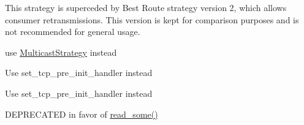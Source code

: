 \begin{DoxyRefList}
\item[\label{deprecated__deprecated000045}%
\hypertarget{deprecated__deprecated000045}{}%
Class \hyperlink{classnfd_1_1fw_1_1BestRouteStrategy}{nfd\+:\+:fw\+:\+:Best\+Route\+Strategy} ]This strategy is superceded by Best Route strategy version 2, which allows consumer retransmissions. This version is kept for comparison purposes and is not recommended for general usage.  
\item[\label{deprecated__deprecated000046}%
\hypertarget{deprecated__deprecated000046}{}%
Class \hyperlink{classnfd_1_1fw_1_1BroadcastStrategy}{nfd\+:\+:fw\+:\+:Broadcast\+Strategy} ]use \hyperlink{classnfd_1_1fw_1_1MulticastStrategy}{Multicast\+Strategy} instead  
\item[\label{deprecated__deprecated000047}%
\hypertarget{deprecated__deprecated000047}{}%
Member \hyperlink{classwebsocketpp_1_1transport_1_1asio_1_1connection_abb0254e3207691c45c9ca7061352a90a}{websocketpp\+:\+:transport\+:\+:asio\+:\+:connection$<$ config $>$\+:\+:set\+\_\+tcp\+\_\+init\+\_\+handler} (tcp\+\_\+init\+\_\+handler h)]Use set\+\_\+tcp\+\_\+pre\+\_\+init\+\_\+handler instead 
\item[\label{deprecated__deprecated000048}%
\hypertarget{deprecated__deprecated000048}{}%
Member \hyperlink{classwebsocketpp_1_1transport_1_1asio_1_1endpoint_a497f353a5ec277355cd8b0caf893d1ce}{websocketpp\+:\+:transport\+:\+:asio\+:\+:endpoint$<$ config $>$\+:\+:set\+\_\+tcp\+\_\+init\+\_\+handler} (tcp\+\_\+init\+\_\+handler h)]Use set\+\_\+tcp\+\_\+pre\+\_\+init\+\_\+handler instead 
\item[\label{deprecated__deprecated000049}%
\hypertarget{deprecated__deprecated000049}{}%
Member \hyperlink{classwebsocketpp_1_1transport_1_1iostream_1_1connection_a72f532fb0a8d339371b8ca112fdd3f66}{websocketpp\+:\+:transport\+:\+:iostream\+:\+:connection$<$ config $>$\+:\+:readsome} (char const $\ast$buf, size\+\_\+t len)]D\+E\+P\+R\+E\+C\+A\+T\+ED in favor of \hyperlink{classwebsocketpp_1_1transport_1_1iostream_1_1connection_a4616555cbee050aec84da1e39a3c34a8}{read\+\_\+some()} 
\end{DoxyRefList}